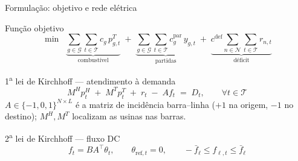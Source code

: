 \documentclass[10pt,aspectratio=169]{beamer}
\newcommand{\Nb}{\mathcal{N}}          %
\newcommand{\Gb}{\mathcal{G}}          %
\newcommand{\Tb}{\mathcal{T}}          %
\newcommand{\pH}{p^{H}}                %
\newcommand{\pT}{p^{T}}                %
\begin{document}
\begin{frame}{Formulação: objetivo e rede elétrica}
  \begin{block}{Função objetivo}
    \[
      \min \;\; \underbrace{\sum_{g \in \Gb}\sum_{t \in \Tb} c_g \, \pT_{g,t}}_{\text{combustível}}
      \;+\; \underbrace{\sum_{g \in \Gb}\sum_{t \in \Tb} c^{\text{par}}_g \, y_{g,t}}_{\text{partidas}}
      \;+\; \underbrace{c^{\text{def}} \sum_{n \in \Nb}\sum_{t \in \Tb} r_{n,t}}_{\text{déficit}}
    \]
  \end{block}

  \begin{block}{1\textsuperscript{a} lei de Kirchhoff --- atendimento à demanda}
    \[
      M^H \pH_t \;+\; M^T \pT_t \;+\; r_t \;-\; A f_t \;=\; D_t,
      \qquad \forall t \in \Tb
    \]
    \footnotesize
    $A \in \{-1,0,1\}^{N \times L}$ é a matriz de incidência barra--linha
    ($+1$ na origem, $-1$ no destino); $M^H, M^T$ localizam as usinas nas barras.
  \end{block}

  \begin{block}{2\textsuperscript{a} lei de Kirchhoff --- fluxo DC}
    \[
      f_t = B A^\top \theta_t, \qquad
      \theta_{\text{ref},t} = 0, \qquad
      -\bar f_\ell \le f_{\ell,t} \le \bar f_\ell
    \]
  \end{block}
\end{frame}
\end{document}
